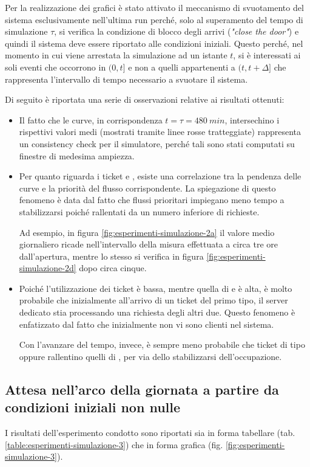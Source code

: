 Per la realizzazione dei grafici è stato attivato il meccanismo di svuotamento del sistema esclusivamente nell'ultima run perché, solo al superamento del tempo di simulazione $\tau$, si verifica la condizione di blocco degli arrivi (\textit{"close the door"}) e quindi il sistema deve essere riportato alle condizioni iniziali. Questo perché, nel momento in cui viene arrestata la simulazione ad un istante $t$, si è interessati ai soli eventi che occorrono in $(0, t]$ e non a quelli appartenenti a $(t, t + \Delta]$ che rappresenta l'intervallo di tempo necessario a svuotare il sistema.

Di seguito è riportata una serie di osservazioni relative ai risultati ottenuti:
\begin{itemize}
\item Il fatto che le curve, in corrispondenza $t = \tau = 480\ min$, intersechino i rispettivi valori medi (mostrati tramite linee rosse tratteggiate) rappresenta un consistency check per il simulatore, perché tali sono stati computati su finestre di medesima ampiezza.
\item Per quanto riguarda i ticket \uo{} e \pp{}, esiste una correlazione tra la pendenza delle curve e la priorità del flusso corrispondente. La spiegazione di questo fenomeno è data dal fatto che flussi prioritari impiegano meno tempo a stabilizzarsi poiché rallentati da un numero inferiore di richieste.

Ad esempio, in figura \ref{fig:esperimenti-simulazione-2a} il valore medio giornaliero ricade nell'intervallo della misura effettuata a circa tre ore dall'apertura, mentre lo stesso si verifica in figura \ref{fig:esperimenti-simulazione-2d} dopo circa cinque.
\item Poiché l'utilizzazione dei ticket \sr{} è bassa, mentre quella di \uo{} e \pp{} è alta, è molto probabile che inizialmente all'arrivo di un ticket del primo tipo, il server dedicato stia processando una richiesta degli altri due. Questo fenomeno è enfatizzato dal fatto che inizialmente non vi sono clienti nel sistema.

Con l'avanzare del tempo, invece, è sempre meno probabile che ticket di tipo \uo{} oppure \pp{} rallentino quelli di \sr{}, per via dello stabilizzarsi dell'occupazione. 
\end{itemize}

\subsection*{Attesa nell'arco della giornata a partire da condizioni iniziali non nulle}
I risultati dell'esperimento condotto sono riportati sia in forma tabellare (tab. \ref{table:esperimenti-simulazione-3}) che in forma grafica (fig. \ref{fig:esperimenti-simulazione-3}).

